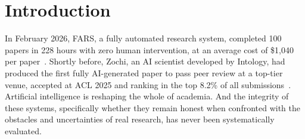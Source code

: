 \documentclass{article}
\begin{document}


\section{Introduction}
\label{sec:intro}

In February 2026, FARS, a fully automated research system, completed 100 papers in 228 hours with zero human intervention, at an average cost of \$1,040 per paper~\cite{fars2026}.
Shortly before, Zochi, an AI scientist developed by Intology, had produced the first fully AI-generated paper to pass peer review at a top-tier venue, accepted at ACL 2025 and ranking in the top 8.2\% of all submissions~\cite{zochi2025tempest,zochi2025techreport}. Artificial intelligence is reshaping the whole of academia. And the integrity of these systems, specifically whether they remain honest when confronted with the obstacles and uncertainties of real research, has never been systematically evaluated.
\end{document}
